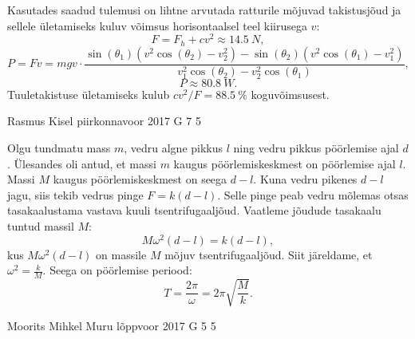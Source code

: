 \documentclass[11pt, twoside]{article}
\begin{document}
{{Kasutades saadud tulemusi on lihtne arvutada ratturile mõjuvad
takistusjõud ja sellele ületamiseks kuluv võimsus horisontaalsel teel
kiirusega $v$:
\[
F=F_{h}+cv^{2}\approx\SI{14.5}{N},
\]
\[
P=Fv=mgv\cdot\frac{\sin(\theta_{1})\left(v^{2}\cos(\theta_2)-v_{2}^{2}\right)-\sin(\theta_{2})\left(v^{2}\cos(\theta_1)-v_{1}^{2}\right)}{v_{1}^{2}\cos(\theta_2)-v_{2}^{2}\cos(\theta_1)},
\]
\[
P\approx\SI{80.8}{W}.
\]
Tuuletakistuse ületamiseks kulub $cv^{2}/F=\SI{88.5}{\percent}$
koguvõimsusest.
\fi
}

{Rasmus Kisel} %
{piirkonnavoor} %
{2017} %
{G 7} %
{5} %
{

\ifSolution
Olgu tundmatu mass $m$, vedru algne pikkus $l$ ning vedru pikkus pöörlemise ajal $d$. Ülesandes oli antud, et massi $m$ kaugus pöörlemiskeskmest on pöörlemise ajal $l$. Massi $M$ kaugus pöörlemiskeskmest on seega $d-l$.
Kuna vedru pikenes $d-l$ jagu, siis tekib vedrus pinge $F=k(d-l)$. Selle pinge peab vedru mõlemas otsas tasakaalustama vastava kuuli tsentrifugaaljõud. Vaatleme jõudude tasakaalu tuntud massil $M$:
\begin{equation*}
M\omega^2(d-l)=k(d-l),
\end{equation*}
kus $M\omega^2(d-l)$ on massile $M$ mõjuv tsentrifugaaljõud.
Siit järeldame, et $\omega^2=\frac{k}{M}$. Seega on pöörlemise periood:
\begin{equation*}
T=\frac{2\pi}{\omega}=2\pi \sqrt{\frac{M}{k}}.
\end{equation*}
\fi
}

{Moorits Mihkel Muru} %
{lõppvoor} %
{2017} %
{G 5} %
{5} %
{

}}
\end{document}
